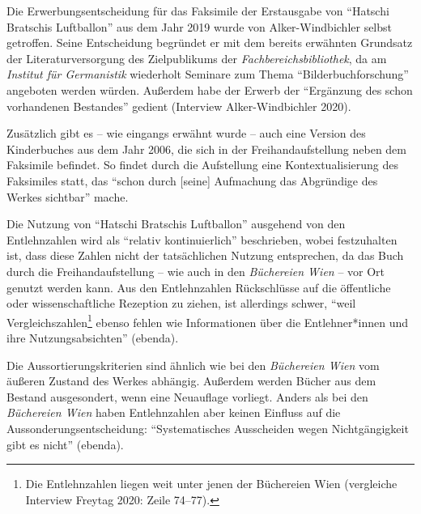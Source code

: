 \documentclass[a4paper,
fontsize=11pt,
oneside,
numbers=noperiodatend,
parskip=half-,
bibliography=totoc,
final
]{scrartcl}
\begin{document}
Die Erwerbungsentscheidung für das Faksimile der Erstausgabe von
\enquote{Hatschi Bratschis Luftballon} aus dem Jahr 2019 wurde von
Alker-Windbichler selbst getroffen. Seine Entscheidung begründet er mit
dem bereits erwähnten Grundsatz der Literaturversorgung des
Zielpublikums der \emph{Fachbereichsbibliothek}, da am \emph{Institut
für Germanistik} wiederholt Seminare zum Thema \enquote{Bilderbuchforschung}
angeboten werden würden. Außerdem habe der Erwerb der \enquote{Ergänzung des
schon vorhandenen Bestandes} gedient (Interview Alker-Windbichler
2020).

Zusätzlich gibt es -- wie eingangs erwähnt wurde -- auch eine Version
des Kinderbuches aus dem Jahr 2006, die sich in der Freihandaufstellung
neben dem Faksimile befindet. So findet durch die Aufstellung eine
Kontextualisierung des Faksimiles statt, das \enquote{schon durch [seine]
Aufmachung das Abgründige des Werkes sichtbar} mache.

Die Nutzung von \enquote{Hatschi Bratschis Luftballon} ausgehend von den
Entlehnzahlen wird als \enquote{relativ kontinuierlich} beschrieben, wobei
festzuhalten ist, dass diese Zahlen nicht der tatsächlichen Nutzung
entsprechen, da das Buch durch die Freihandaufstellung -- wie auch in
den \emph{Büchereien Wien} -- vor Ort genutzt werden kann. Aus den
Entlehnzahlen Rückschlüsse auf die öffentliche oder wissenschaftliche
Rezeption zu ziehen, ist allerdings schwer, \enquote{weil
Vergleichszahlen\footnote{Die Entlehnzahlen liegen weit unter jenen der
  Büchereien Wien (vergleiche Interview Freytag 2020: Zeile 74--77).}
ebenso fehlen wie Informationen über die Entlehner*innen und ihre
Nutzungsabsichten} (ebenda).

Die Aussortierungskriterien sind ähnlich wie bei den \emph{Büchereien
Wien} vom äußeren Zustand des Werkes abhängig. Außerdem werden Bücher
aus dem Bestand ausgesondert, wenn eine Neuauflage vorliegt. Anders als
bei den \emph{Büchereien Wien} haben Entlehnzahlen aber keinen Einfluss
auf die Aussonderungsentscheidung: \enquote{Systematisches Ausscheiden wegen
Nichtgängigkeit gibt es nicht} (ebenda).
\end{document}
